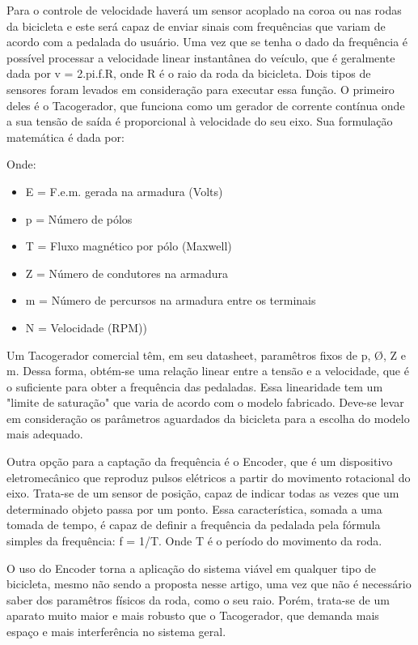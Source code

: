 Para o controle de velocidade haverá um sensor acoplado na coroa ou nas rodas da bicicleta e este será capaz de enviar sinais com frequências que variam de acordo com a pedalada do usuário. Uma vez que se tenha o dado da frequência é possível processar a velocidade linear instantânea do veículo, que é geralmente dada por v = 2.pi.f.R, onde R é o raio da roda da bicicleta.
Dois tipos de sensores foram levados em consideração para executar essa função. O primeiro deles é o Tacogerador, que funciona como um gerador de corrente contínua onde a sua tensão de saída é proporcional à velocidade do seu eixo. Sua formulação matemática é dada por:
	
	
	Onde: 
	\begin{itemize}
	\item E = F.e.m. gerada na armadura (Volts)
	\item p = Número de pólos
	\item T = Fluxo magnético por pólo (Maxwell)
	\item Z = Número de condutores na armadura
	\item m = Número de percursos na armadura entre os terminais
	\item N = Velocidade (RPM))
	\end{itemize}

	Um Tacogerador comercial têm, em seu datasheet, paramêtros fixos de p, Ø, Z e m. Dessa forma, obtém-se uma relação linear entre a tensão e a velocidade, que é o suficiente para obter a frequência das pedaladas. Essa linearidade tem um "limite de saturação" que varia de acordo com o modelo fabricado. Deve-se levar em consideração os parâmetros aguardados da bicicleta para a escolha do modelo mais adequado.

Outra opção para a captação da frequência é o Encoder, que é um dispositivo eletromecânico que reproduz pulsos elétricos a partir do movimento rotacional do eixo. Trata-se de um sensor de posição, capaz de indicar todas as vezes que um determinado objeto passa por um ponto. Essa característica, somada a uma tomada de tempo, é capaz de definir a frequência da pedalada pela fórmula simples da frequência: f = 1/T. Onde T é o período do movimento da roda.

O uso do Encoder torna a aplicação do sistema viável em qualquer tipo de bicicleta, mesmo não sendo a proposta nesse artigo, uma vez que não é necessário saber dos paramêtros físicos da roda, como o seu raio. Porém, trata-se de um aparato muito maior e mais robusto que o Tacogerador, que demanda mais espaço e mais interferência no sistema geral.

